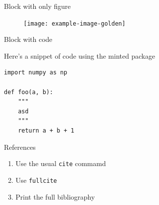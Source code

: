 \documentclass[aspectratio=1610]{beamer}
\begin{document}
\begin{frame}[fragile]{}
\begin{columns}[t]
\begin{column}{.5\linewidth}
            \begin{haiblock}{Block with only figure}

            \begin{figure}
                \centering
                \texttt{[image: example-image-golden]}
            \end{figure}
            \end{haiblock}
            
            \begin{haiblock}{Block with code}

                Here's a snippet of code using the minted package

                \begin{verbatim}
import numpy as np

def foo(a, b):
    """
    asd
    """
    return a + b + 1
                \end{verbatim}

            \end{haiblock}

            \begin{haiblock}{References}

                \begin{enumerate}
                    \item 
                        Use the usual \texttt{cite} commamd~\cite{baydin_2018}
                    \item 
                        Use \texttt{fullcite} \\
                    \item 
                        Print the full bibliography
                \end{enumerate}

                \printbibliography
            \end{haiblock}

            
        \end{column}
    \end{columns}
    

\end{frame}
\end{document}
